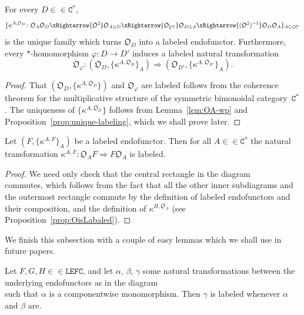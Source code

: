 \documentclass[10pt]{simplearticle}
\newcommand{\tikzinput}[1]{}
\newcommand{\LEFC}{\mathbb{\mathtt{LEFC}}}
\newcommand{\Cstar}{\mathtt{C^{*}}}
\begin{document}
\begin{prop}\label{prop:OisLabaled}
For every $D\in\in\Cstar$,
\[
\{\kappa^{A,\mathfrak{O}_{D}}\colon\mathfrak{O}_{A}\mathfrak{O}_{D}\xRightarrow{\mathfrak{O}^{2}}\mathfrak{O}_{A\otimes D}\xRightarrow{\mathfrak{O}_{\xi^{\otimes}}}\mathfrak{O}_{D\otimes A}\xRightarrow{(\mathfrak{O}^{2})^{-1}}\mathfrak{O}_{D}\mathfrak{O}_{A}\}_{A\in\in\Cstar}
\]
is the unique family which turns $\mathfrak{O}_{D}$ into a labeled
endofunctor. Furthermore, every $*$-homomorphism $\varphi\colon D\to D'$
induces a labeled natural transformation
\[
\mathfrak{O}_{\varphi}\colon(\mathfrak{O}_{D},\{\kappa^{A,\mathfrak{O}_{D}}\}_{A})\Rightarrow(\mathfrak{O}_{D'},\{\kappa^{A,\mathfrak{O}_{D'}}\}_{A}).
\]
\end{prop}

\begin{proof}
That $(\mathfrak{O}_{D},\{\kappa^{A,\mathfrak{O}_{D}}\})$ and $\mathfrak{O}_{\varphi}$
are labeled follows from the coherence theorem for the multiplicative
structure of the symmetric bimonoidal category~$\Cstar$. The uniqueness
of $\{\kappa^{A,\mathfrak{O}_{D}}\}$ follows from Lemma~\ref{lem:OA-wp}
and Proposition~\ref{prop:unique-labeling}, which we shall prove
later.
\end{proof}

\begin{prop}\label{prop:kappa-labeled}
Let $(F,\{\kappa^{A,F}\}_{A})$ be a labeled
endofunctor. Then for all $A\in\in\Cstar$ the natural transformation
$\kappa^{A,F}\colon\mathfrak{O}_{A}F\Rightarrow F\mathfrak{O}_{A}$
is labeled.
\end{prop}

\begin{proof}
We need only check that the central rectangle in the diagram
\[
\tikzinput{d491}
\]
commutes, which follows from the fact that all the other inner subdiagrams
and the outermost rectangle commute by the definition of labeled endofunctors
and their composition, and the definition of $\kappa^{B,\mathfrak{O}_{A}}$
(see Proposition~\ref{prop:OisLabaled}).
\end{proof}

We finish this subsection with a couple of easy lemmas which we shall
use in future papers.
\begin{lem}\label{lem:abg}
Let $F,G,H\in\in\LEFC$, and let $\alpha$, $\beta$,
$\gamma$ some natural transformations between the underlying endofunctors
as in the diagram
\[
\tikzinput{d467}
\]
such that $\alpha$ is a componentwise monomorphism. Then $\gamma$
is labeled whenever $\alpha$ and $\beta$ are.
\end{lem}
\end{document}
